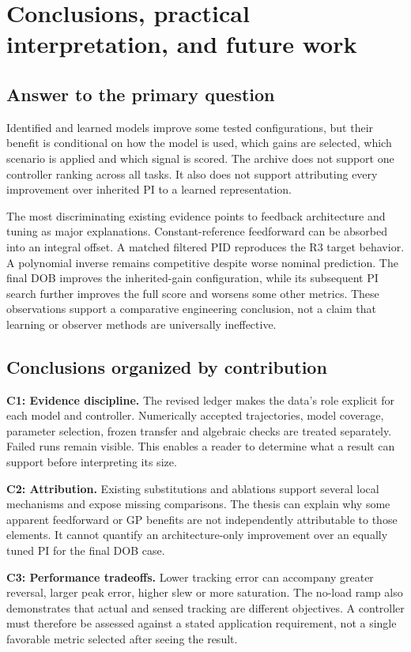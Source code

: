 \chapter{Conclusions, practical interpretation, and future work}
\label{ch:conclusions}
\section{Answer to the primary question}
Identified and learned models improve some tested configurations, but their benefit is conditional on how the model is used, which gains are selected, which scenario is applied and which signal is scored. The archive does not support one controller ranking across all tasks. It also does not support attributing every improvement over inherited PI to a learned representation.

The most discriminating existing evidence points to feedback architecture and tuning as major explanations. Constant-reference feedforward can be absorbed into an integral offset. A matched filtered PID reproduces the R3 target behavior. A polynomial inverse remains competitive despite worse nominal prediction. The final DOB improves the inherited-gain configuration, while its subsequent PI search further improves the full score and worsens some other metrics. These observations support a comparative engineering conclusion, not a claim that learning or observer methods are universally ineffective.

\section{Conclusions organized by contribution}
\textbf{C1: Evidence discipline.} The revised ledger makes the data's role explicit for each model and controller. Numerically accepted trajectories, model coverage, parameter selection, frozen transfer and algebraic checks are treated separately. Failed runs remain visible. This enables a reader to determine what a result can support before interpreting its size.

\textbf{C2: Attribution.} Existing substitutions and ablations support several local mechanisms and expose missing comparisons. The thesis can explain why some apparent feedforward or GP benefits are not independently attributable to those elements. It cannot quantify an architecture-only improvement over an equally tuned PI for the final DOB case.

\textbf{C3: Performance tradeoffs.} Lower tracking error can accompany greater reversal, larger peak error, higher slew or more saturation. The no-load ramp also demonstrates that actual and sensed tracking are different objectives. A controller must therefore be assessed against a stated application requirement, not a single favorable metric selected after seeing the result.

